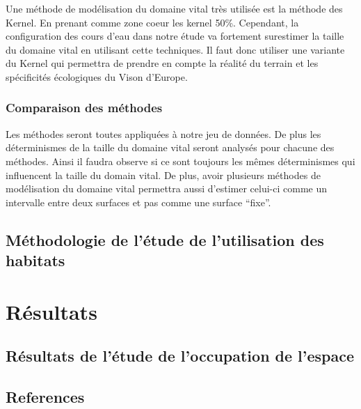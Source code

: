 \documentclass[
  letterpaper,
  DIV=11,
  numbers=noendperiod]{scrreprt}
\begin{document}
Une méthode de modélisation du domaine vital très utilisée est la
méthode des Kernel. En prenant comme zone coeur les kernel 50\%.
Cependant, la configuration des cours d'eau dans notre étude va
fortement surestimer la taille du domaine vital en utilisant cette
techniques. Il faut donc utiliser une variante du Kernel qui permettra
de prendre en compte la réalité du terrain et les spécificités
écologiques du Vison d'Europe.

\section{Comparaison des méthodes}\label{comparaison-des-muxe9thodes}

Les méthodes seront toutes appliquées à notre jeu de données. De plus
les déterminismes de la taille du domaine vital seront analysés pour
chacune des méthodes. Ainsi il faudra observe si ce sont toujours les
mêmes déterminismes qui influencent la taille du domain vital. De plus,
avoir plusieurs méthodes de modélisation du domaine vital permettra
aussi d'estimer celui-ci comme un intervalle entre deux surfaces et pas
comme une surface ``fixe''.

\chapter{Méthodologie de l'étude de l'utilisation des
habitats}\label{muxe9thodologie-de-luxe9tude-de-lutilisation-des-habitats}

\part{Résultats}

\chapter{Résultats de l'étude de l'occupation de
l'espace}\label{ruxe9sultats-de-luxe9tude-de-loccupation-de-lespace}


\chapter*{References}\label{references}

\end{document}
